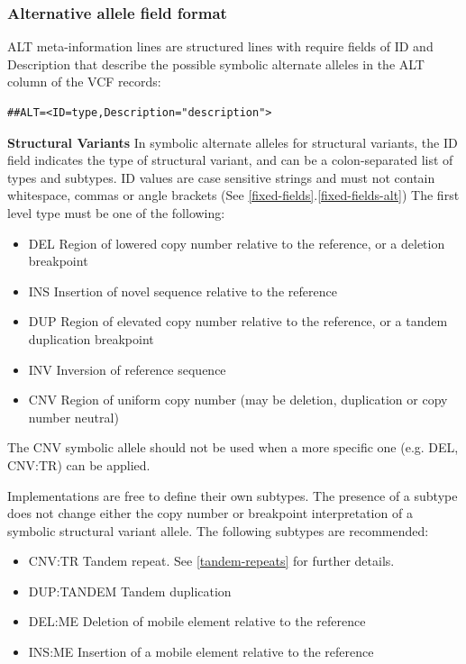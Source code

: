 \documentclass[8pt]{article}
\begin{document}
\subsubsection{Alternative allele field format} \label{altfield}
ALT meta-information lines are structured lines with require fields of ID and Description that describe the possible symbolic alternate alleles in the ALT column of the VCF records:

\begin{verbatim}
##ALT=<ID=type,Description="description">
\end{verbatim}

\noindent \textbf{Structural Variants} \newline
In symbolic alternate alleles for structural variants, the ID field indicates the type of structural variant, and can be a colon-separated list of types and subtypes.
ID values are case sensitive strings and must not contain whitespace, commas or angle brackets (See \ref{fixed-fields}.\ref{fixed-fields-alt})
The first level type must be one of the following:
\begin{itemize}
  \item DEL Region of lowered copy number relative to the reference, or a deletion breakpoint
  \item INS Insertion of novel sequence relative to the reference
  \item DUP Region of elevated copy number relative to the reference, or a tandem duplication breakpoint
  \item INV Inversion of reference sequence
  \item CNV Region of uniform copy number (may be deletion, duplication or copy number neutral)
\end{itemize}

The CNV symbolic allele should not be used when a more specific one (e.g. DEL, CNV:TR) can be applied.

Implementations are free to define their own subtypes.
The presence of a subtype does not change either the copy number or breakpoint interpretation of a symbolic structural variant allele.
The following subtypes are recommended:
\begin{itemize}
  \item CNV:TR Tandem repeat. See \ref{tandem-repeats} for further details.
  \item DUP:TANDEM Tandem duplication
  \item DEL:ME Deletion of mobile element relative to the reference
  \item INS:ME Insertion of a mobile element relative to the reference
\end{itemize}
\end{document}
